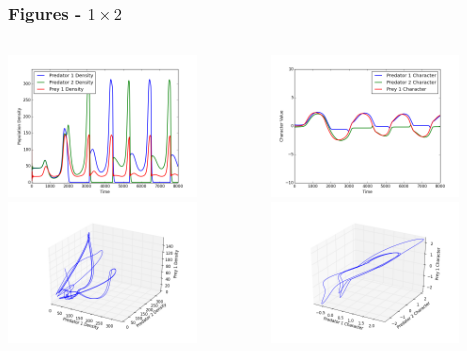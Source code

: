\documentclass[10pt]{beamer}
\begin{document}
\begin{frame}
	\frametitle{Figures - $1\times2$}
	\begin{columns}[t]
		\begin{column}{.5\textwidth}
			\centering
			\includegraphics[width=5cm,height=3.75cm]{figures/2x1/variable_growth/densities_slow_prey_evo.png}\\
			\includegraphics[width=5cm,height=3.75cm]{figures/2x1/variable_growth/density_phase_plane_slow_prey_evo.png}
		\end{column}
		\begin{column}{.5\textwidth}
			\centering
			\includegraphics[width=5cm,height=3.75cm]{figures/2x1/variable_growth/traits_slow_prey_evo.png}\\
			\includegraphics[width=5cm,height=3.75cm]{figures/2x1/variable_growth/trait_phase_plane_slow_prey_evo.png}
		\end{column}
	\end{columns}
\end{frame}
\end{document}

